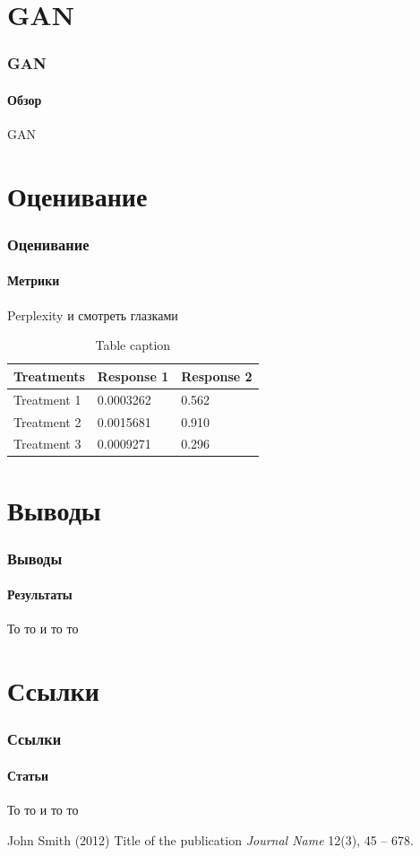 \documentclass[10pt]{beamer}
\begin{document}
\section{GAN}
\begin{frame}
\frametitle{GAN}
\framesubtitle{Обзор}

GAN

\end{frame}
\section{Оценивание}
\begin{frame}
\frametitle{Оценивание}
\framesubtitle{Метрики}

Perplexity и смотреть глазками \\

\begin{table}
\begin{tabular}{l l l}
\toprule
\textbf{Treatments} & \textbf{Response 1} & \textbf{Response 2}\\
\midrule
Treatment 1 & 0.0003262 & 0.562 \\
Treatment 2 & 0.0015681 & 0.910 \\
Treatment 3 & 0.0009271 & 0.296 \\
\bottomrule
\end{tabular}
\caption{Table caption}
\end{table}

\end{frame}
\section{Выводы}
\begin{frame}
\frametitle{Выводы}
\framesubtitle{Результаты}

То то и то то

\end{frame}
\section{Ссылки}
\begin{frame}
\frametitle{Ссылки}
\framesubtitle{Статьи}

То то и то то \\

\footnotesize{
\begin{thebibliography}{99}
 John Smith (2012)
\newblock Title of the publication
\newblock \emph{Journal Name} 12(3), 45 -- 678.
\end{thebibliography}
}

\end{frame}
\end{document}
